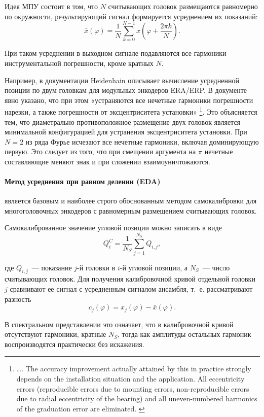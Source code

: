 Идея МПУ состоит в том, что $N$ считывающих головок размещаются равномерно по окружности, результирующий сигнал формируется усреднением их показаний:
$$
\bar{x}(\varphi)
=
\frac{1}{N}
\sum_{k=0}^{N-1}
x\!\left(\varphi + \frac{2\pi k}{N}\right).
$$

При таком усреднении в выходном сигнале подавляются все гармоники инструментальной погрешности, кроме кратных $N$.

Например, в документации \cite{heidenhain-modular-angle-encoders} Heidenhain описывает вычисление усредненной позиции по двум  головкам для модульных энкодеров ERA/ERP. В документе явно указано, что при этом «устраняются все нечетные гармоники погрешности нарезки, а также погрешности от эксцентриситета установки» \footnote{\dots. The accuracy improvement actually attained by this in practice strongly
depends on the installation situation and the application. All eccentricity errors (reproducible errors due to mounting errors,
non-reproducible errors due to radial eccentricity of the bearing) and all uneven-numbered harmonics of the graduation error are eliminated. \cite{heidenhain-modular-angle-encoders}}. Это объясняется тем, что диаметрально противоположное размещение двух головок является минимальной конфигурацией для устранения эксцентриситета установки. При $N = 2$ из ряда Фурье исчезают все нечетные гармоники, включая доминирующую первую. Это следует из того, что при смещении аргумента на $\pi$ нечетные составляющие меняют знак и при сложении взаимоуничтожаются. 

\paragraph{Метод усреднения при равном делении (EDA)} \cite{watanabe-eda} является базовым и наиболее строго обоснованным методом самокалибровки для многоголовочных энкодеров с равномерным размещением считывающих головок.

Самокалиброванное значение угловой позиции можно записать в виде
$$
Q_i^{C}
=
\frac{1}{N_S}
\sum_{j=1}^{N_S}
Q_{i,j},
$$

где $Q_{i,j}$~--- показание $j$-й головки в $i$-й угловой позиции, а $N_S$~--- число считывающих головок.
Для получения калибровочной кривой отдельной головки $j$ сравнивают ее сигнал с усредненным сигналом ансамбля, т.~е. рассматривают разность
$$
c_j(\varphi)
=
x_j(\varphi) - \bar{x}(\varphi).
$$

В спектральном представлении это означает, что в калибровочной кривой отсутствуют гармоники, кратные $N_S$, тогда как амплитуды остальных гармоник воспроизводятся практически без искажения.

